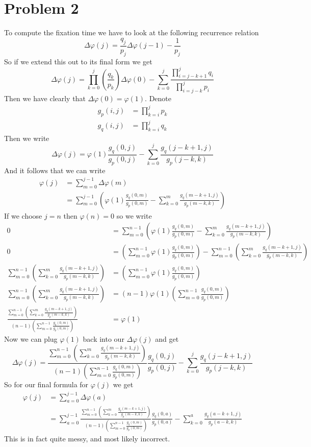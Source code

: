\documentclass{article}
\theoremstyle{definition}
\begin{document}
\section*{Problem 2}
To compute the fixation time we have to look at the following recurrence relation
\[
    \Delta \varphi (j) = \frac{q_j}{p_j} \Delta \varphi(j - 1) - \frac{1}{p_j}  
\]
So if we extend this out to its final form we get 
\[
    \Delta \varphi (j) = \prod_{k=0}^j \left(\frac{q_k}{p_k}\right)\Delta \varphi(0) - \sum_{k = 0}^j \frac{\prod_{i = j - k + 1}^j q_i}{\prod_{i = j - k}^j p_i}
\]
Then we have clearly that $\Delta \varphi(0) = \varphi(1)$. 
Denote \begin{align*}
    g_p(i,j) &= \prod_{k = i}^j p_k \\
    g_q(i,j) &= \prod_{k = i}^j q_k
\end{align*}
Then we write 
\[
    \Delta \varphi(j) = \varphi(1) \frac{g_q(0,j)}{g_p(0,j)} - \sum_{k=0}^j \frac{g_q(j- k + 1, j)}{g_p(j-k,k)}
\]
And it follows that we can write 
\begin{align*}
    \varphi(j) &= \sum_{m = 0}^{j-1} \Delta \varphi(m)\\
    &= \sum_{m=0}^{j-1}\left(\varphi(1) \frac{g_q(0,m)}{g_p(0,m)} - \sum_{k=0}^m \frac{g_q(m- k + 1, j)}{g_p(m-k,k)}\right)
\end{align*}
If we choose $j = n$ then $\varphi(n) = 0$ so we write 
\begin{align*}
    0&= \sum_{m=0}^{n-1}\left(\varphi(1) \frac{g_q(0,m)}{g_p(0,m)} - \sum_{k=0}^m \frac{g_q(m- k + 1, j)}{g_p(m-k,k)}\right)\\
    0&= \left(\sum_{m=0}^{n-1}\varphi(1) \frac{g_q(0,m)}{g_p(0,m)}\right) - \sum_{m=0}^{n-1}\left(\sum_{k=0}^m \frac{g_q(m- k + 1, j)}{g_p(m-k,k)}\right)\\
    \sum_{m=0}^{n-1}\left(\sum_{k=0}^m \frac{g_q(m- k + 1, j)}{g_p(m-k,k)}\right)&=\left(\sum_{m=0}^{n-1}\varphi(1) \frac{g_q(0,m)}{g_p(0,m)}\right)\\
    \sum_{m=0}^{n-1}\left(\sum_{k=0}^m \frac{g_q(m- k + 1, j)}{g_p(m-k,k)}\right) &= (n-1)\varphi(1) \left(\sum_{m=0}^{n-1} \frac{g_q(0,m)}{g_p(0,m)}\right)\\
    \frac{\sum_{m=0}^{n-1}\left(\sum_{k=0}^m \frac{g_q(m- k + 1, j)}{g_p(m-k,k)}\right)}{(n-1)\left(\sum_{m=0}^{n-1} \frac{g_q(0,m)}{g_p(0,m)}\right)} &= \varphi(1)
\end{align*}
Now we can plug $\varphi(1)$ back into our $\Delta\varphi(j)$ and get 
\[
    \Delta \varphi(j) = \frac{\sum_{m=0}^{n-1}\left(\sum_{k=0}^m \frac{g_q(m- k + 1, j)}{g_p(m-k,k)}\right)}{(n-1)\left(\sum_{m=0}^{n-1} \frac{g_q(0,m)}{g_p(0,m)}\right)} \frac{g_q(0,j)}{g_p(0,j)} - \sum_{k=0}^j \frac{g_q(j- k + 1, j)}{g_p(j-k,k)}
\]
So for our final formula for $\varphi(j)$ we get 
\begin{align*}
    \varphi(j) &= \sum_{a = 0}^{j-1} \Delta \varphi(a)\\
    &=  \sum_{a=0}^{j-1}\frac{\sum_{m=0}^{n-1}\left(\sum_{k=0}^m \frac{g_q(m- k + 1, j)}{g_p(m-k,k)}\right)}{(n-1)\left(\sum_{m=0}^{n-1} \frac{g_q(0,m)}{g_p(0,m)}\right)} \frac{g_q(0,a)}{g_p(0,a)} - \sum_{k=0}^a \frac{g_q(a- k + 1, j)}{g_p(a-k,k)}
\end{align*}
This is in fact quite messy, and most likely incorrect.
\end{document}
